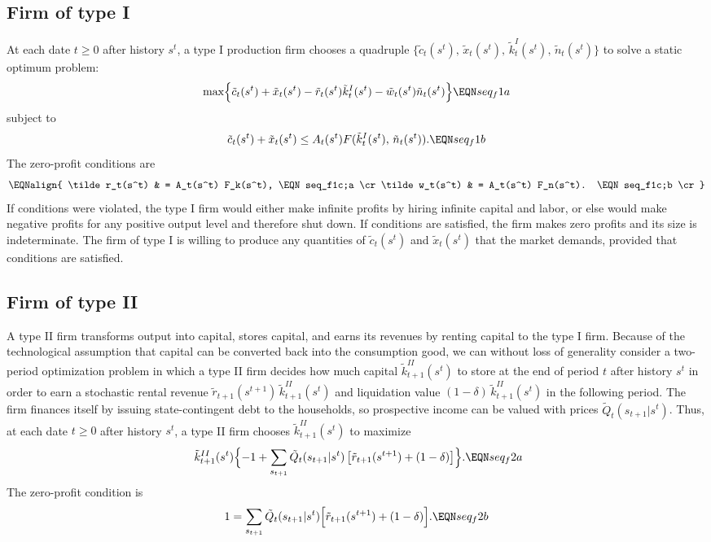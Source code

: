 \subsection{Firm of type I}\label{sec:FirmI}%
At each date $t \geq 0$ after history $s^t$,
a type I production firm 
chooses a quadruple $\{\tilde c_t(s^t),\, \tilde x_t(s^t), \,
\tilde k_t^I(s^t),\, \tilde n_t(s^t)\}$
to solve a static optimum problem:
$$ \max\Bigl\{ \tilde c_t(s^t) + \tilde x_t(s^t)
- \tilde r_t(s^t) \tilde k^I_t(s^t)
- \tilde w_t(s^t) \tilde n_t(s^t) \Bigr\}      \EQN seq_f1a  $$
subject to
$$ \tilde c_t(s^t) + \tilde x_t(s^t) \leq  A_t(s^t)
F( \tilde k^I_t(s^t),\, \tilde n_t(s^t) ). \EQN seq_f1b $$
The zero-profit conditions are
$$ \EQNalign{ \tilde r_t(s^t) & = A_t(s^t) F_k(s^t),  \EQN seq_f1c;a \cr
              \tilde w_t(s^t) & = A_t(s^t) F_n(s^t).  \EQN seq_f1c;b \cr} $$
If conditions  were violated, the type I firm would
either make infinite profits by hiring infinite capital
and labor, or else would make negative profits for any positive
output level and therefore shut down.  If conditions 
are satisfied, the firm makes zero profits and its size is
indeterminate.  The firm of type I is willing to produce
any quantities of $\tilde c_t(s^t)$ and $\tilde x_t(s^t)$ that the
market demands, provided
that conditions  are satisfied.




\subsection{Firm of type II}\label{sec:FirmII}%
A type  II firm transforms output into capital, stores capital,
 and earns its revenues by renting
capital to the type I firm. Because of the technological
assumption that capital can be converted back into the consumption
good, we can without loss of generality consider a
two-period optimization problem in which a type II firm decides how
much capital $\tilde k_{t+1}^{II}(s^t)$ to store at the end of
period $t$ after history $s^t$ in order to earn a stochastic
rental revenue $\tilde r_{t+1}(s^{t+1}) \,\tilde k_{t+1}^{II}(s^t)$
and liquidation value $(1-\delta) \,\tilde k_{t+1}^{II}(s^t)$
in the following period. The firm finances itself by issuing state-contingent
 debt to the households, so prospective income  can
be valued with prices
$\tilde Q_t(s_{t+1} | s^t)$.  Thus, at each date $t \geq 0$ after
history $s^t$, a type II firm chooses $\tilde k_{t+1}^{II}(s^t)$
to maximize
$$    \; \tilde k_{t+1}^{II}(s^t) \Bigl\{ -1 +
\sum_{s_{t+1}} \tilde Q_t(s_{t+1} | s^t)
\left[ \tilde r_{t+1}(s^{t+1}) + (1-\delta)
                           \right]\Bigr\} .    \EQN seq_f2a  $$
The zero-profit condition is
$$ 1 = \sum_{s_{t+1}} \tilde Q_t(s_{t+1} | s^t)
\Bigl[ \tilde r_{t+1}(s^{t+1}) + (1-\delta)
                           \Bigr]. \EQN seq_f2b $$


